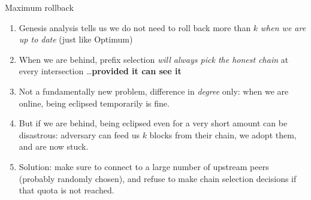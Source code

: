 \documentclass[usenames,dvipsnames,t]{beamer}
\begin{document}
\begin{frame}{Maximum rollback}

\begin{enumerate}

\item Genesis analysis tells us we do not need to roll back more than $k$
\emph{when we are up to date} (just like Optimum)

\item When we are behind, prefix selection \emph{will always pick the honest
chain} at every intersection \dots \pause \textbf{provided it can see it}

\pause

\item Not a fundamentally new problem, difference in \emph{degree} only: when we are online, being eclipsed temporarily is fine.

\item But if we are behind, being eclipsed even for a very short amount can be disastrous: adversary can feed us $k$ blocks from their chain, we adopt them,
and are now stuck.

\pause

\item Solution: make sure to connect to a large number of upstream peers
(probably randomly chosen), and refuse to make chain selection decisions if
that quota is not reached.

\end{enumerate}

\end{frame}

\end{document}
